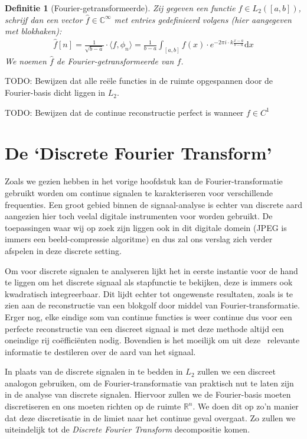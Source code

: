\documentclass[11pt]{amsart}
\newcommand{\R}{\mathbb{R}}
\newcommand{\C}{\mathbb{C}}
\newtheorem*{definitie}{Definitie}
\theoremstyle{remark}
\newcommand{\eq}[1]{\begin{eqnarray*} #1 \end{eqnarray*}}
\newcommand{\coefficient}{co\"effici\"ent}
\newcommand{\dx}{\text{d}x}
\newcommand{\Ldnorm}[1]{{||#1||_{L_2}}}
\newcommand{\inpr}[2]{\langle #1 , #2 \rangle}
\begin{document}
\begin{definitie}[Fourier-getransformeerde]
Zij gegeven een functie $f\in L_2({[a,b]})$, schrijf dan een vector $\hat f \in \C^\infty$ met entries gedefinieerd volgens (hier aangegeven met blokhaken):
\eq{
  \hat f [n] = \frac{1}{\sqrt{b-a}} \cdot \inpr{f}{\phi_n} = \frac{1}{b-a} \int_{[a,b]} f(x) \cdot e^{-2 \pi i \cdot k \frac{x-a}{b-a}}\dx 
}
We noemen $\hat f$ de Fourier-getransformeerde van $f$.
\end{definitie}

TODO: Bewijzen dat alle re\"ele functies in de ruimte opgespannen door de Fourier-basis dicht liggen in $L_2$.

TODO: Bewijzen dat de continue reconstructie perfect is wanneer $f \in C^1$


\section{De `Discrete Fourier Transform'}
Zoals we gezien hebben in het vorige hoofdstuk kan de Fourier-transformatie gebruikt worden om continue signalen te karakteriseren voor verschillende frequenties. Een groot gebied binnen de signaal-analyse is echter van discrete aard aangezien hier toch veelal digitale instrumenten voor worden gebruikt. De toepassingen waar wij op zoek zijn liggen ook in dit digitale domein (JPEG is immers een beeld-compressie algoritme) en dus zal ons verslag zich verder afspelen in deze discrete setting.

Om voor discrete signalen te analyseren lijkt het in eerste instantie voor de hand te liggen om het discrete signaal als stapfunctie te bekijken, deze is immers ook kwadratisch integreerbaar. Dit lijdt echter tot ongewenste resultaten, zoals is te zien aan de reconstructie van een blokgolf door middel van Fourier-transformatie. Erger nog, elke eindige som van continue functies is weer continue dus voor een perfecte reconstructie van een discreet signaal is met deze methode altijd een oneindige rij \coefficient en nodig. Bovendien is het moeilijk om uit deze \coeffiecienten~relevante informatie te destileren over de aard van het signaal.

In plaats van de discrete signalen in te bedden in $L_2$ zullen we een discreet analogon gebruiken, om de Fourier-transformatie van praktisch nut te laten zijn in de analyse van discrete signalen. 
Hiervoor zullen we de Fourier-basis moeten discretiseren en ons moeten richten op de ruimte $\R^n$.
We doen dit op zo'n manier dat deze discretisatie in de limiet naar het continue geval overgaat. 
Zo zullen we uiteindelijk tot de \emph{Discrete Fourier Transform} decompositie komen.
\end{document}
